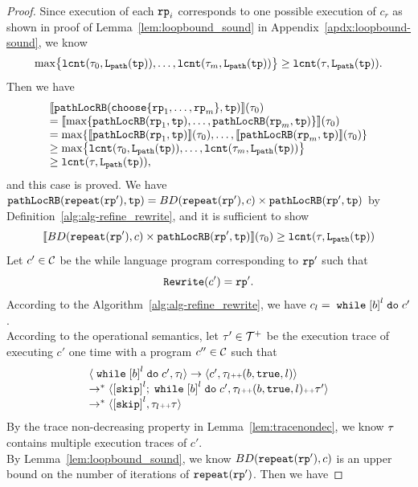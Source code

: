 \begin{proof}
Since execution of each $\mathtt{rp}_i$ corresponds to one possible execution of $c_r$ as shown in proof of Lemma~\ref{lem:loopbound_sound} in Appendix~\ref{apdx:loopbound-sound}, we know
\[
  \max\left\{\lcounter(\trace_0, \pathl(\tpath)), \ldots, \lcounter(\trace_m, \pathl(\tpath)) \right\} 
  \geq \lcounter(\trace, \pathl(\tpath)).
\]
Then we have
\[
  \begin{array}{l}
  \econfig{\outinB(\rpchoose{\rprog_1, \ldots, \rprog_m }, \tpath)}(\trace_0)
  \\
  = \econfig{\max\left\{ \outinB(\rprog_1, \tpath), \ldots, \outinB(\rprog_m, \tpath) \right\}}(\trace_0)
  \\
  = \max\left\{\econfig{\outinB(\rprog_1, \tpath)}(\trace_0), \ldots, \econfig{ \outinB(\rprog_m, \tpath)}(\trace_0) \right\}
  \\
  \geq \max\left\{\lcounter(\trace_0, \pathl(\tpath)), \ldots, \lcounter(\trace_m, \pathl(\tpath)) \right\} 
  \\
  \geq \lcounter(\trace, \pathl(\tpath)),
  \end{array}
\] 
and this case is proved.
We have $\mathtt{pathLocRB}(\mathtt{repeat}(\mathtt{rp}'), \mathtt{tp}) = BD(\mathtt{repeat}(\mathtt{rp}'), c) \times \mathtt{pathLocRB}(\mathtt{rp}', \mathtt{tp})$
by Definition~\ref{alg:alg-refine_rewrite}, and
it is sufficient to show
\[
  \llbracket  BD(\mathtt{repeat}(\mathtt{rp}'), c) \times \mathtt{pathLocRB}(\mathtt{rp}', \mathtt{tp}) \rrbracket (\mathtt{\tau}_0) \geq \mathtt{lcnt}(\mathtt{\tau}, \mathtt{L}_{\mathtt{path}}(\mathtt{tp})) 
\]
Let $c' \in \mathcal{C}$ be the while language program corresponding to $\mathtt{rp}'$ such that 
$$\mathtt{Rewrite}(c') = \mathtt{rp}'.$$
According to the Algorithm~\ref{alg:alg-refine_rewrite}, we have $c_l = \ewhile \clabel{\bexpr}^{l} \edo c'$.
\\
According to the operational semantics, let $\mathtt{\tau}' \in \mathcal{T}^{+}$ be the execution trace of executing $c'$ one time with a program $c'' \in \mathcal{C}$ such that 
\[
  \begin{array}{l}
  \config{\ewhile \clabel{\bexpr}^{l} \edo c', \trace_l} 
  \to \config{c', \trace_l \tracecat (\bexpr, \etrue, l)} \\
  \to^* \config{\clabel{\eskip}^{l}; \ewhile \clabel{\bexpr}^{l} \edo c', \trace_l \tracecat (\bexpr, \etrue, l) \tracecat \trace'}\\
  \to^* \config{\clabel{\eskip}^{l}, \trace_l \tracecat \trace}
  \end{array}
\]
By the trace non-decreasing property in Lemma~\ref{lem:tracenondec}, we know $\mathtt{\tau}$ contains multiple execution traces of $c'$.
\\
By Lemma~\ref{lem:loopbound_sound}, we know $BD(\mathtt{repeat}(\mathtt{rp}'), c)$ is an upper bound on the number of iterations of $\mathtt{repeat}(\mathtt{rp}')$. Then we have

\end{proof}
